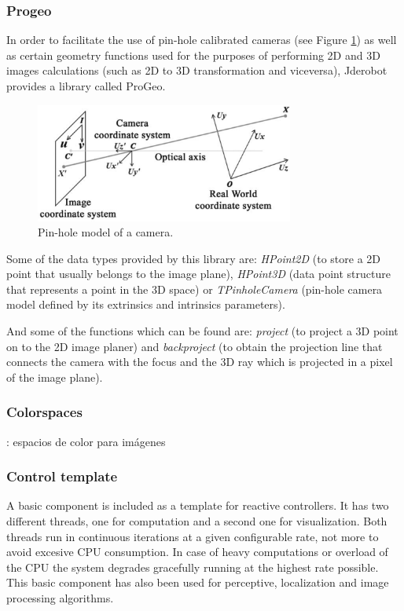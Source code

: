 \documentclass[twocolumn]{svjour3}          %
\begin{document}
\subsubsection{Progeo}
\label{subsec:progeo}

In order to facilitate the use of pin-hole calibrated cameras (see Figure \ref{fig:pinholemodel}) as well as certain geometry functions used for the purposes of performing 2D and 3D images calculations (such as 2D to 3D transformation and viceversa), Jderobot provides a library called ProGeo.

\begin{figure}[h!]
  \includegraphics[width=8.5cm]{figs/pinholemodel.png}
\caption{Pin-hole model of a camera.}
\label{fig:pinholemodel}
\end{figure}

Some of the data types provided by this library are: \textit{HPoint2D} (to store a 2D point that usually belongs to the image plane), \textit{HPoint3D} (data point structure that represents a point in the 3D space) or \textit{TPinholeCamera} (pin-hole camera model defined by its extrinsics and intrinsics parameters).

And some of the functions which can be found are: \textit{project} (to project a 3D point on to the 2D image planer) and \textit{backproject} (to obtain the projection line that connects the camera with the focus and the 3D ray which is projected in a pixel of the image plane).

\subsubsection{Colorspaces}: espacios de color para imágenes

\subsubsection{Control template}

A basic component is included as a template for reactive controllers. It has two different threads, one for computation and a second one for visualization. Both threads run in continuous iterations at a given configurable rate, not more to avoid excesive CPU consumption. In case of heavy computations or overload of the CPU the system degrades gracefully running at the highest rate possible. This basic component has also been used for perceptive, localization and image processing algorithms.
\end{document}
